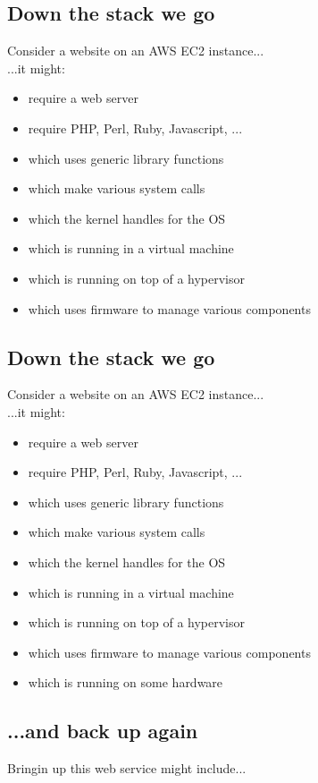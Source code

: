 \documentclass[xga]{xdvislides}
\begin{document}
\subsection{Down the stack we go}
Consider a website on an AWS EC2 instance...
\\

...it might:

\begin{itemize}
	\item require a web server
	\item require PHP, Perl, Ruby, Javascript, ...
	\item which uses generic library functions
	\item which make various system calls
	\item which the kernel handles for the OS
	\item which is running in a virtual machine
	\item which is running on top of a hypervisor
	\item which uses firmware to manage various components
\end{itemize}

\subsection{Down the stack we go}
Consider a website on an AWS EC2 instance...
\\

...it might:

\begin{itemize}
	\item require a web server
	\item require PHP, Perl, Ruby, Javascript, ...
	\item which uses generic library functions
	\item which make various system calls
	\item which the kernel handles for the OS
	\item which is running in a virtual machine
	\item which is running on top of a hypervisor
	\item which uses firmware to manage various components
	\item which is running on some hardware
\end{itemize}

\subsection{...and back up again}
Bringin up this web service might include...
\\
\end{document}
